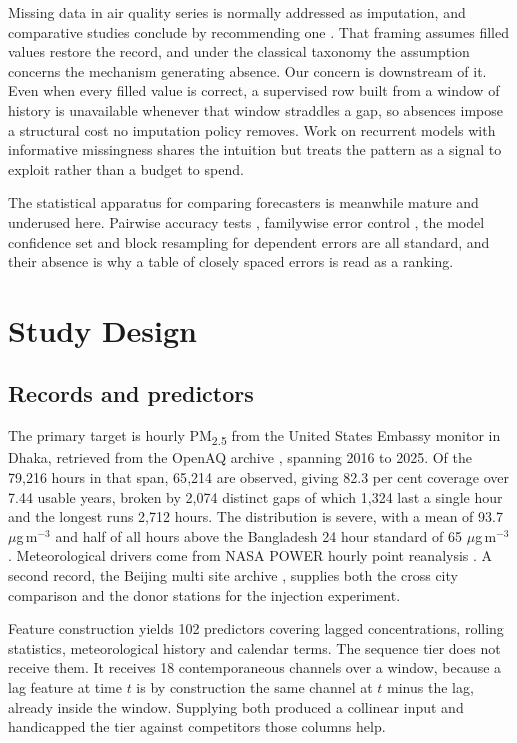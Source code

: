 \documentclass[conference]{IEEEtran}
\newcommand{\ugm}{$\mu$g\,m$^{-3}$}
\begin{document}
Missing data in air quality series is normally addressed as imputation, and comparative studies
conclude by recommending one \cite{karnati2025}. That framing assumes filled values restore the
record, and under the classical taxonomy \cite{rubin1976} the assumption concerns the mechanism
generating absence. Our concern is downstream of it. Even when every filled value is correct, a
supervised row built from a window of history is unavailable whenever that window straddles a
gap, so absences impose a structural cost no imputation policy removes. Work on recurrent
models with informative missingness \cite{che2018grud} shares the intuition but treats the
pattern as a signal to exploit rather than a budget to spend.

The statistical apparatus for comparing forecasters is meanwhile mature and underused here.
Pairwise accuracy tests \cite{diebold1995}, familywise error control \cite{holm1979}, the
model confidence set \cite{hansen2011mcs} and block resampling for dependent errors
\cite{kunsch1989} are all standard, and their absence is why a table of closely spaced errors
is read as a ranking.

\section{Study Design}

\subsection{Records and predictors}

The primary target is hourly PM\textsubscript{2.5} from the United States Embassy monitor in
Dhaka, retrieved from the OpenAQ archive \cite{openaq}, spanning 2016 to 2025. Of the
79{,}216 hours in that span, 65{,}214 are observed, giving 82.3 per cent coverage over 7.44
usable years, broken by 2{,}074 distinct gaps of which 1{,}324 last a single hour and the
longest runs 2{,}712 hours. The distribution is severe, with a mean of 93.7 \ugm{} and half
of all hours above the Bangladesh 24 hour standard of 65 \ugm{} \cite{doe2025}.
Meteorological drivers come from NASA POWER hourly point reanalysis \cite{nasapower}. A
second record, the Beijing multi site archive \cite{zhang2017beijing}, supplies both the
cross city comparison and the donor stations for the injection experiment.

Feature construction yields 102 predictors covering lagged concentrations, rolling statistics,
meteorological history and calendar terms. The sequence tier does not receive them. It receives
18 contemporaneous channels over a window, because a lag feature at time $t$ is by construction
the same channel at $t$ minus the lag, already inside the window. Supplying both produced a
collinear input and handicapped the tier against competitors those columns help.
\end{document}
